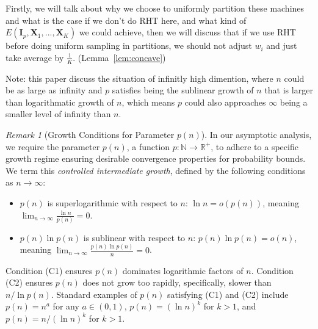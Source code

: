 \documentclass[11pt]{article}
\numberwithin{equation}{section}
\theoremstyle{plain}
\theoremstyle{definition}
\theoremstyle{remark}
\newtheorem{remark}[theorem]{Remark}
\begin{document}
Firstly, we will talk about why we choose to uniformly partition these machines and what is the case if we don't do RHT here, and what kind of $E(\mathbf{I}_p,\mathbf{X}_1,...,\mathbf{X}_K)$ we could achieve, then we will discuss that if we use RHT before doing uniform sampling in partitions, we should not adjust $w_i$ and just take average by $\frac{1}{K}$. (Lemma~\ref{lem:concave})

Note: this paper discuss the situation of infinitly high dimention, where $n$ could be as large as infinity and $p$ satisfies being the sublinear growth of $n$ that is larger than logarithmatic growth of $n$, which means $p$ could also approaches $\infty$ being a smaller level of infinity than $n$.
\begin{remark}[Growth Conditions for Parameter $p(n)$]
\label{remark:sublinear}
In our asymptotic analysis, we require the parameter $p(n)$, a function $p: \mathbb{N} \to \mathbb{R}^+$, to adhere to a specific growth regime ensuring desirable convergence properties for probability bounds. We term this \emph{controlled intermediate growth}, defined by the following conditions as $n \to \infty$:
\begin{itemize}
    \item[(C1)] $p(n)$ is superlogarithmic with respect to $n$: $\ln n = o(p(n))$, meaning $\lim_{n \to \infty} \frac{\ln n}{p(n)} = 0$.
    \item[(C2)] $p(n)\ln p(n)$ is sublinear with respect to $n$: $p(n)\ln p(n) = o(n)$, meaning $\lim_{n \to \infty} \frac{p(n)\ln p(n)}{n} = 0$.
\end{itemize}
Condition (C1) ensures $p(n)$ dominates logarithmic factors of $n$. Condition (C2) ensures $p(n)$ does not grow too rapidly, specifically, slower than $n/\ln p(n)$. Standard examples of $p(n)$ satisfying (C1) and (C2) include $p(n) = n^a$ for any $a \in (0,1)$, $p(n) = (\ln n)^k$ for $k > 1$, and $p(n) = n/(\ln n)^k$ for $k > 1$.
\end{remark}
\end{document}
